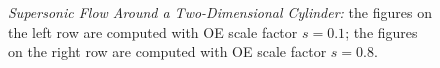 \documentclass[fleqn,11pt]{amsart}
\begin{document}
{\begin{figure}[H]
  \caption{\textit{Supersonic Flow Around a Two-Dimensional Cylinder:} the figures on the left row are computed with OE scale factor $s=0.1$; the figures on the right row are computed with OE scale factor $s=0.8$.}
  \label{fig:cylinder2}
\end{figure}

}
\end{document}
